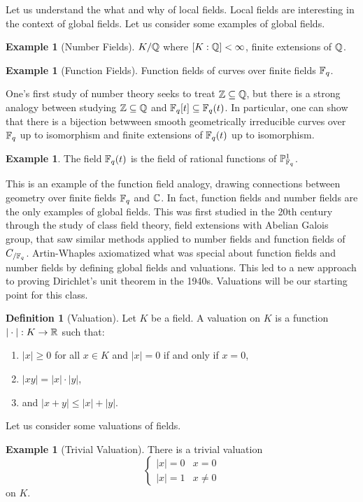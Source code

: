 \documentclass{amsart}
\theoremstyle{definition}
\newtheorem{example}[theorem]{Example}
\newtheorem{definition}[theorem]{Definition}
\numberwithin{equation}{section}
\begin{document}
Let us understand the what and why of local fields. Local fields are interesting in the context of global fields. Let us consider some examples of global fields. 
\begin{example}[Number Fields]
  $K/\mathbb{Q}$ where $[K:\mathbb{Q}]<\infty$, finite extensions of $\mathbb{Q}$. 
\end{example}
\begin{example}[Function Fields]
  Function fields of curves over finite fields $\mathbb{F}_{q}$. 
\end{example}
One's first study of number theory seeks to treat $\mathbb{Z}\subseteq\mathbb{Q}$, but there is a strong analogy between studying $\mathbb{Z}\subseteq\mathbb{Q}$ and $\mathbb{F}_{q}[t]\subseteq\mathbb{F}_{q}(t)$. In particular, one can show that there is a bijection betwween smooth geometrically irreducible curves over $\mathbb{F}_{q}$ up to isomorphism and finite extensions of $\mathbb{F}_{q}(t)$ up to isomorphism. 
\begin{example}
  The field $\mathbb{F}_{q}(t)$ is the field of rational functions of $\mathbb{P}^{1}_{\mathbb{F}_{q}}$. 
\end{example}
This is an example of the function field analogy, drawing connections between geometry over finite fields $\mathbb{F}_{q}$ and $\mathbb{C}$. In fact, function fields and number fields are the only examples of global fields. This was first studied in the 20th century through the study of class field theory, field extensions with Abelian Galois group, that saw similar methods applied to number fields and function fields of $C_{/\mathbb{F}_{q}}$. Artin-Whaples axiomatized what was special about function fields and number fields by defining global fields and valuations. This led to a new approach to proving Dirichlet's unit theorem in the 1940s. Valuations will be our starting point for this class. 
\begin{definition}[Valuation]
  Let $K$ be a field. A valuation on $K$ is a function $|\cdot|:K\to\mathbb{R}$ such that: 
  \begin{enumerate}[label=(\alph*)]
    \item $|x|\geq0$ for all $x\in K$ and $|x|=0$ if and only if $x=0$, 
    \item $|xy|=|x|\cdot|y|$, 
    \item and $|x+y|\leq|x|+|y|$. 
  \end{enumerate}
\end{definition}
Let us consider some valuations of fields. 
\begin{example}[Trivial Valuation]
  There is a trivial valuation
  $$\begin{cases}
  |x| = 0 & x=0 \\
  |x| = 1 & x\neq0
  \end{cases}$$
  on $K$. 
\end{example}
\end{document}
